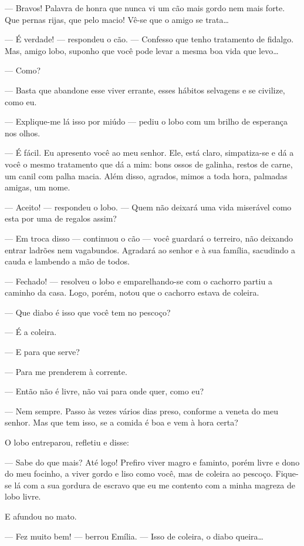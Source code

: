 --- Bravos! Palavra de honra que nunca vi um cão mais gordo nem mais
forte. Que pernas rijas, que pelo macio! Vê-se que o amigo se
trata\ldots{}

--- É verdade! --- respondeu o cão. --- Confesso que tenho tratamento de
fidalgo. Mas, amigo lobo, suponho que você pode levar a mesma boa vida
que levo\ldots{}

--- Como?

--- Basta que abandone esse viver errante, esses hábitos selvagens e se
civilize, como eu.

--- Explique-me lá isso por miúdo --- pediu o lobo com um brilho de
esperança nos olhos.

--- É fácil. Eu apresento você ao meu senhor. Ele, está claro,
simpatiza-se e dá a você o mesmo tratamento que dá a mim: bons ossos de
galinha, restos de carne, um canil com palha macia. Além disso, agrados,
mimos a toda hora, palmadas amigas, um nome.

--- Aceito! --- respondeu o lobo. --- Quem não deixará uma vida
miserável como esta por uma de regalos assim?

--- Em troca disso --- continuou o cão --- você guardará o terreiro, não
deixando entrar ladrões nem vagabundos. Agradará ao senhor e à sua
família, sacudindo a cauda e lambendo a mão de todos.

--- Fechado! --- resolveu o lobo e emparelhando-se com o cachorro partiu
a caminho da casa. Logo, porém, notou que o cachorro estava de coleira.

--- Que diabo é isso que você tem no pescoço?

--- É a coleira.

--- E para que serve?

--- Para me prenderem à corrente.

--- Então não é livre, não vai para onde quer, como eu?

--- Nem sempre. Passo às vezes vários dias preso, conforme a veneta do
meu senhor. Mas que tem isso, se a comida é boa e vem à hora certa?

O lobo entreparou, refletiu e disse:

--- Sabe do que mais? Até logo! Prefiro viver magro e faminto, porém
livre e dono do meu focinho, a viver gordo e liso como você, mas de
coleira ao pescoço. Fique-se lá com a sua gordura de escravo que eu me
contento com a minha magreza de lobo livre.

E afundou no mato.

--- Fez muito bem! --- berrou Emília. --- Isso de coleira, o diabo
queira\ldots{}

